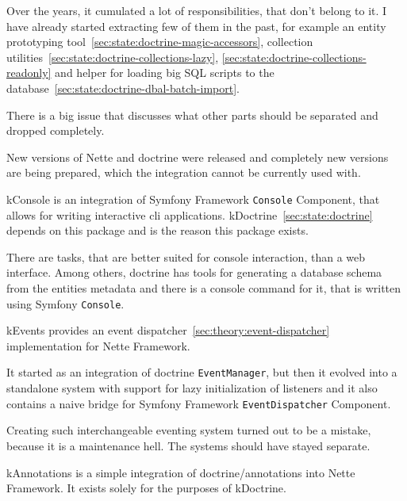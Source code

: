 Over the years, it cumulated a lot of responsibilities, that don't belong to it. I have already started extracting few of them in the past, for example an entity prototyping tool~\ref{sec:state:doctrine-magic-accessors}, collection utilities~\ref{sec:state:doctrine-collections-lazy}, \ref{sec:state:doctrine-collections-readonly} and helper for loading big SQL scripts to the database~\ref{sec:state:doctrine-dbal-batch-import}.

There is a big issue  that discusses what other parts should be separated and dropped completely.

New versions of Nette and \gls{doctrine} were released and completely new versions are being prepared, which the integration cannot be currently used with.

 \label{sec:state:console}

\gls{kConsole} is an integration of Symfony Framework \lstinline{Console} Component, that allows for writing interactive cli applications. \gls{kDoctrine}~\ref{sec:state:doctrine} depends on this package and is the reason this package exists.

There are tasks, that are better suited for console interaction, than a web interface. Among others, \gls{doctrine} has tools for generating a database schema from the entities metadata and there is a console command for it, that is written using Symfony \lstinline{Console}.

 \label{sec:state:events}

\gls{kEvents} provides an event dispatcher~\ref{sec:theory:event-dispatcher} implementation for Nette Framework.

It started as an integration of \gls{doctrine} \lstinline{EventManager}, but then it evolved into a standalone system with support for lazy initialization of listeners and it also contains a naive bridge for Symfony Framework \lstinline{EventDispatcher} Component.

Creating such interchangeable eventing system turned out to be a mistake, because it is a maintenance hell. The systems should have stayed separate.

 \label{sec:state:annotations}

\gls{kAnnotations} is a simple integration of doctrine/annotations into Nette Framework. It exists solely for the purposes of \gls{kDoctrine}.

